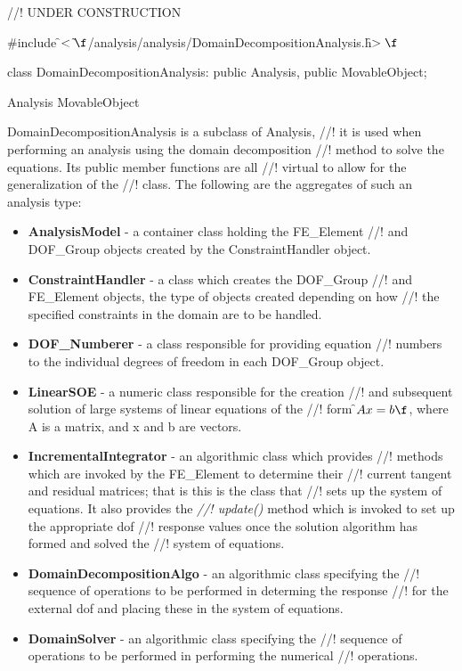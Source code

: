 
//! UNDER CONSTRUCTION

\indent \#include \f$<\tilde{
}\f$/analysis/analysis/DomainDecompositionAnalysis.h\f$>\f$ 

\indent class DomainDecompositionAnalysis: public Analysis, public MovableObject;

\indent Analysis
\indent MovableObject
\indent{}

\indent DomainDecompositionAnalysis is a subclass of Analysis, 
//! it is used when performing an analysis using the domain decomposition
//! method to solve the equations. Its public member functions are all
//! virtual to allow for the generalization of the 
//! class. The following are the aggregates of such an analysis type:
\begin{itemize}
\item {\bf AnalysisModel} - a container class holding the FE\_Element
//! and DOF\_Group objects created by the ConstraintHandler object. 
\item {\bf ConstraintHandler} - a class which creates the DOF\_Group
//! and FE\_Element objects, the type of objects created depending on how
//! the specified constraints in the domain are to be handled. 
\item {\bf DOF\_Numberer} - a class responsible for providing equation
//! numbers to the individual degrees of freedom in each DOF\_Group object.
\item {\bf LinearSOE} - a numeric class responsible for the creation
//! and subsequent solution of large systems of linear equations of the
//! form \f$Ax = b\f$, where A is a matrix, and x and b are vectors.
\item {\bf IncrementalIntegrator} - an algorithmic class which provides
//! methods which are invoked by the FE\_Element to determine their
//! current tangent and residual matrices; that is this is the class that
//! sets up the system of equations.  It also provides the {\em
//! update()} method which is invoked to set up the appropriate dof
//! response values once the solution algorithm has formed and solved the
//! system of equations.
\item {\bf DomainDecompositionAlgo} - an algorithmic class specifying the
//! sequence of operations to be performed in determing the response
//! for the external dof and placing these in the system of equations.
\item {\bf DomainSolver} - an algorithmic class specifying the
//! sequence of operations to be performed in performing the numerical 
//! operations.
\end{itemize}


